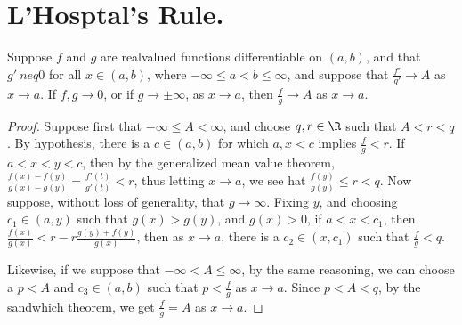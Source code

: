 
\section{L'Hosptal's Rule.}

\begin{theorem}\label{6.4.1}
    Suppose $f$ and  $g$ are realvalued functions differentiable on  $(a,b)$, and that 
    $g' \ neq 0$ for all  $x \in (a,b)$, where $-\infty \leq a<b \leq \infty$, and suppose that 
     $ \frac{f'}{g'} \rightarrow A$ as $x \rightarrow a$. If $f,g \rightarrow 0$, or if  $g \rightarrow \pm\infty$, as  $x \rightarrow a$, 
     then  $ \frac{f}{g} \rightarrow A$ as $x \rightarrow a$.
\end{theorem}
\begin{proof}
    Suppose first that $-\infty \leq A<\infty$, and choose  $q,r \in \R$ such that $A<r<q$. By hypothesis, 
    there is a $c \in (a,b)$ for which $a,x<c$ implies $\frac{f}{g}<r$. If $a<x<y<c$, then by the 
    generalized mean value theorem, $ \frac{f(x)-f(y)}{g(x)-g(y)}=\frac{f'(t)}{g'(t)}<r$, thus 
    letting $x \rightarrow a$, we see  hat $ \frac{f(y)}{g(y)} \leq r<q$. Now suppose, without loss 
    of generality, that $g \rightarrow \infty$. Fixing $y$, and choosing  $c_1 \in (a,y)$ such that 
    $g(x)>g(y)$, and  $g(x)>0$, if  $a<x<c_1$, then $ \frac{f(x)}{g(x)}<r-r\frac{g(y)+f(y)}{g(x)}$, then 
    as $x \rightarrow a$, there is a  $c_2 \in (x,c_1)$ such that $ \frac{f}{g}<q$.

    Likewise, if we suppose that $-\infty<A \leq \infty$, by the same reasoning, we can choose a 
    $p<A$ and $c_3 \in (a,b)$ such that $p<\frac{f}{g}$ as $x \rightarrow a$. Since  $p<A<q$, 
    by the sandwhich theorem, we get  $ \frac{f}{g}=A$ as $x \rightarrow a$.
\end{proof}
